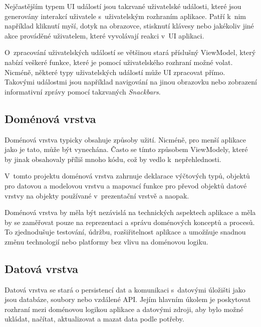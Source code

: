 Nejčastějším typem UI událostí jsou takzvané uživatelské události, které jsou generovány interakcí uživatele s~uživatelským rozhraním aplikace. \cite{UIEvents}
Patří k~nim například kliknutí myší, dotyk na obrazovce, stisknutí klávesy nebo jakékoliv jiné akce prováděné uživatelem, které vyvolávají reakci
v~UI aplikaci.

O~zpracování uživatelských událostí se většinou stará příslušný ViewModel, který nabízí veškeré funkce, které je pomocí uživatelského rozhraní možné volat.
Nicméně, některé typy uživatelských událostí může UI zpracovat přímo. Takovými událostmi jsou například navigování na jinou obrazovku nebo zobrazení 
informativní zprávy pomocí takzvaných \textit{Snackbars}.

\subsection*{Doménová vrstva}
Doménová vrstva typicky obsahuje způsoby užití. Nicméně, pro menší aplikace jako je tato, může být vynechána. \cite{domainLayerAnd} Často se tímto 
způsobem  ViewModely, které by jinak obsahovaly příliš mnoho kódu, což by vedlo k~nepřehlednosti.

V~tomto projektu doménová vrstva zahrnuje deklarace výčtových typů, objektů pro datovou a modelovou vrstvu a mapovací funkce pro převod
objektů datové vrstvy na objekty používané v~prezentační vrstvě a naopak.

Doménová vrstva by měla být nezávislá na technických aspektech aplikace a měla by se zaměřovat pouze na reprezentaci a správu doménových
 konceptů a procesů. To zjednodušuje testování, údržbu, rozšiřitelnost aplikace a umožňuje snadnou změnu technologií nebo platformy bez 
 vlivu na doménovou logiku.

\subsection*{Datová vrstva}


Datová vrstva se stará o persistencí dat a komunikaci s~datovými úložišti jako jsou
databáze, soubory nebo vzdálené API. Jejím hlavním úkolem je poskytovat rozhraní mezi doménovou logikou aplikace a datovými zdroji, 
aby bylo možné ukládat, načítat, aktualizovat a mazat data podle potřeby. \cite{datalayer}

